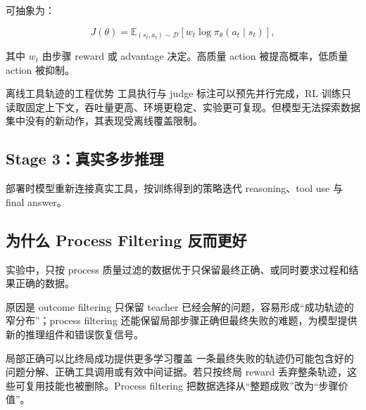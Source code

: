 

可抽象为：

$$
J(\theta)=\mathbb E_{(s_t,a_t)\sim\mathcal D}
\left[w_t\log\pi_\theta(a_t\mid s_t)\right],
$$

其中 $w_t$ 由步骤 reward 或 advantage 决定。高质量 action 被提高概率，低质量 action 被抑制。

\begin{knowledgebox}{离线工具轨迹的工程优势}
工具执行与 judge 标注可以预先并行完成，RL 训练只读取固定上下文，吞吐量更高、环境更稳定、实验更可复现。但模型无法探索数据集中没有的新动作，其表现受离线覆盖限制。
\end{knowledgebox}

\subsection{Stage 3：真实多步推理}

部署时模型重新连接真实工具，按训练得到的策略迭代 reasoning、tool use 与 final answer。


\subsection{为什么 Process Filtering 反而更好}

实验中，只按 process 质量过滤的数据优于只保留最终正确、或同时要求过程和结果正确的数据。


原因是 outcome filtering 只保留 teacher 已经会解的问题，容易形成“成功轨迹的窄分布”；process filtering 还能保留局部步骤正确但最终失败的难题，为模型提供新的推理组件和错误恢复信号。

\begin{importantbox}{局部正确可以比终局成功提供更多学习覆盖}
一条最终失败的轨迹仍可能包含好的问题分解、正确工具调用或有效中间证据。若只按终局 reward 丢弃整条轨迹，这些可复用技能也被删除。Process filtering 把数据选择从“整题成败”改为“步骤价值”。
\end{importantbox}

